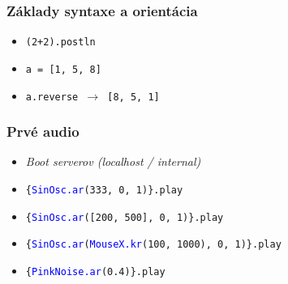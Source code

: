 \documentclass{beamer}
\begin{document}
\begin{frame}
	\frametitle{Základy syntaxe a orientácia}
	\begin{itemize}
		\item \texttt{(2+2).postln} 
		\item \texttt{a = [1, 5, 8]}
		\item \texttt{a.reverse $\rightarrow$ [8, 5, 1]}
	\end{itemize}
\end{frame}

\begin{frame}
	\frametitle{Prvé audio}
	\begin{itemize}
		\item \emph{Boot serverov (localhost / internal)}
		\item \texttt{\{\textcolor{blue}{SinOsc.ar}(333, 0, 1)\}.play}
		\item \texttt{\{\textcolor{blue}{SinOsc.ar}([200, 500], 0, 1)\}.play}
		\item \texttt{\{\textcolor{blue}{SinOsc.ar}(\textcolor{blue}{MouseX.kr}(100, 1000), 0, 1)\}.play}
		\item \texttt{\{\textcolor{blue}{PinkNoise.ar}(0.4)\}.play}
		
	\end{itemize}
\end{frame}
\end{document}
